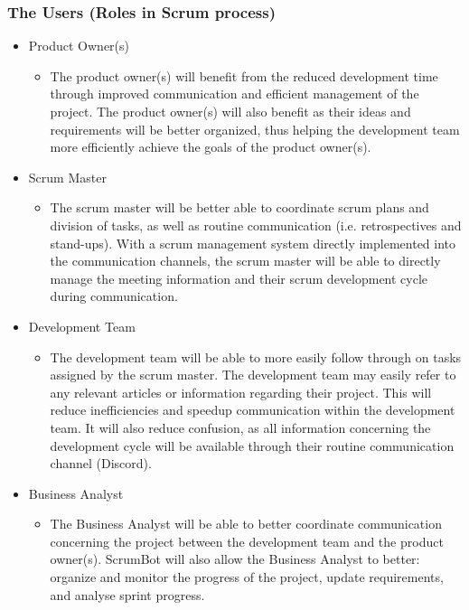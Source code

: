 \documentclass[12pt, titlepage]{article}
\begin{document}
\subsubsection{The Users (Roles in Scrum process)}
\begin{itemize}
    \item Product Owner(s)
    \begin{itemize}
      \item[] The product owner(s) will benefit from the reduced development time through improved communication and efficient management of the project. The product owner(s) will also benefit as their ideas and requirements will be better organized, thus helping the development team more efficiently achieve the goals of the product owner(s).
    \end{itemize}
    \item Scrum Master
    \begin{itemize}
      \item[] The scrum master will be better able to coordinate scrum plans and division of tasks, as well as routine communication (i.e. retrospectives and stand-ups). With a scrum management system directly implemented into the communication channels, the scrum master will be able to directly manage the meeting information and their scrum development cycle during communication.
    \end{itemize}
    \item Development Team
    \begin{itemize}
      \item[] The development team will be able to more easily follow through on tasks assigned by the scrum master. The development team may easily refer to any relevant articles or information regarding their project. This will reduce inefficiencies and speedup communication within the development team. It will also reduce confusion, as all information concerning the development cycle will be available through their routine communication channel (Discord).
    \end{itemize}
    \item Business Analyst
    \begin{itemize}
      \item[] The Business Analyst will be able to better coordinate communication concerning the project between the development team and the product owner(s). ScrumBot will also allow the Business Analyst to better: organize and monitor the progress of the project, update requirements, and analyse sprint progress.
    \end{itemize}
\end{itemize}
\end{document}
